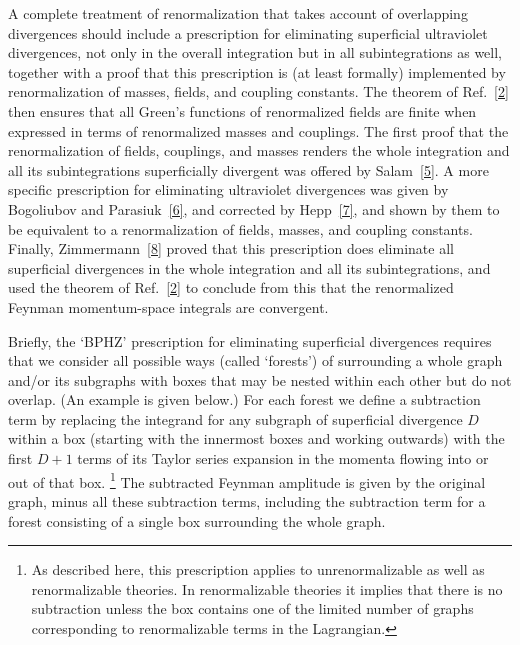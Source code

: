 

A complete treatment of renormalization that takes account of overlapping
divergences should include a prescription for eliminating superficial
ultraviolet divergences, not only in the overall integration but in all
subintegrations as well, together with a proof that this prescription is (at
least formally) implemented by renormalization of masses, fields, and
coupling constants. The theorem of Ref.~\hyperref[ref:12.2]{[2]} then
ensures that all Green's functions of renormalized fields are finite when
expressed in terms of renormalized masses and couplings. The first proof that
the renormalization of fields, couplings, and masses renders the whole
integration and all its subintegrations superficially divergent was offered
by Salam~\hyperref[ref:12.5]{[5]}. A more specific prescription for
eliminating ultraviolet divergences was given by Bogoliubov and
Parasiuk~\hyperref[ref:12.6]{[6]}, and corrected by
Hepp~\hyperref[ref:12.7]{[7]}, and shown by them to be equivalent to a
renormalization of fields, masses, and coupling constants. Finally,
Zimmermann~\hyperref[ref:12.8]{[8]} proved that this prescription does
eliminate all superficial divergences in the whole integration and all its
subintegrations, and used the theorem of Ref.~\hyperref[ref:12.2]{[2]} to
conclude from this that the renormalized Feynman momentum-space integrals
are convergent.

Briefly, the `BPHZ' prescription for eliminating superficial divergences
requires that we consider all possible ways (called `forests') of surrounding
a whole graph and/or its subgraphs with boxes that may be nested within each
other but do not overlap. (An example is given below.) For each forest we
define a subtraction term by replacing the integrand for any subgraph of
superficial divergence $D$ within a box (starting with the innermost boxes and
working outwards) with the first $D+1$ terms of its Taylor series expansion
in the momenta flowing into or out of that box.
\footnote{As described here, this prescription applies to unrenormalizable as
well as renormalizable theories. In renormalizable theories it implies that
there is no subtraction unless the box contains one of the limited number of
graphs corresponding to renormalizable terms in the Lagrangian.}
The subtracted Feynman amplitude is given by the original graph, minus all
these subtraction terms, including the subtraction term for a forest
consisting of a single box surrounding the whole graph.

